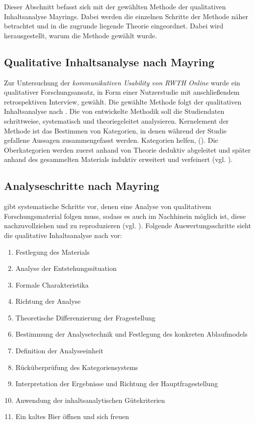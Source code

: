Dieser Abschnitt befasst sich mit der gewählten Methode der qualitativen Inhaltsanalyse Mayrings. Dabei werden die einzelnen Schritte der Methode näher betrachtet und in die zugrunde liegende Theorie eingeordnet. Dabei wird herausgestellt, warum die Methode gewählt wurde.

\subsection{Qualitative Inhaltsanalyse nach Mayring}

Zur Untersuchung der \emph{kommunikativen Usability von RWTH Online} wurde ein qualitativer Forschungsansatz, in Form einer Nutzerstudie mit anschließendem retrospektiven Interview, gewählt.
Die gewählte Methode folgt der qualitativen Inhaltsanalyse nach \citeauthor{mayring2010qualitative}. Die von \citeauthor{mayring2010qualitative} entwickelte Methodik soll die Studiendaten schrittweise, systematisch und theoriegeleitet analysieren. Kernelement der Methode ist das Bestimmen von Kategorien, in denen während der Studie gefallene Aussagen zusammengefasst werden. Kategorien helfen,  (\cite[36]{meyen2011qualitative}). Die Oberkategorien werden zuerst anhand von Theorie deduktiv abgeleitet und später anhand des gesammelten Materials induktiv erweitert und verfeinert (vgl. \cite[13]{mayring2010qualitative}).

\subsection*{Analyseschritte nach Mayring}

\citeauthor{mayring2010qualitative} gibt systematische Schritte vor, denen eine Analyse von qualitativem Forschungsmaterial folgen muss, sodass es auch im Nachhinein möglich ist, diese nachzuvollziehen und zu reproduzieren (vgl. \cite[54]{mayring2010qualitative}). Folgende Auswertungsschritte sieht die qualitative Inhaltsanalyse nach \citeauthor{mayring2010qualitative} vor:

\begin{enumerate}
  \item Festlegung des Materials
  \item Analyse der Entstehungssituation
  \item Formale Charakteristika
  \item Richtung der Analyse
  \item Theoretische Differenzierung der Fragestellung
  \item Bestimmung der Analysetechnik und Festlegung des konkreten Ablaufmodels
  \item Definition der Analyseeinheit
  \item Rücküberprüfung des Kategoriensystems
  \item Interpretation der Ergebnisse und Richtung der Hauptfragestellung
  \item Anwendung der inhaltsanalytischen Gütekriterien
  \item Ein kaltes Bier öffnen und sich freuen %
\end{enumerate}


